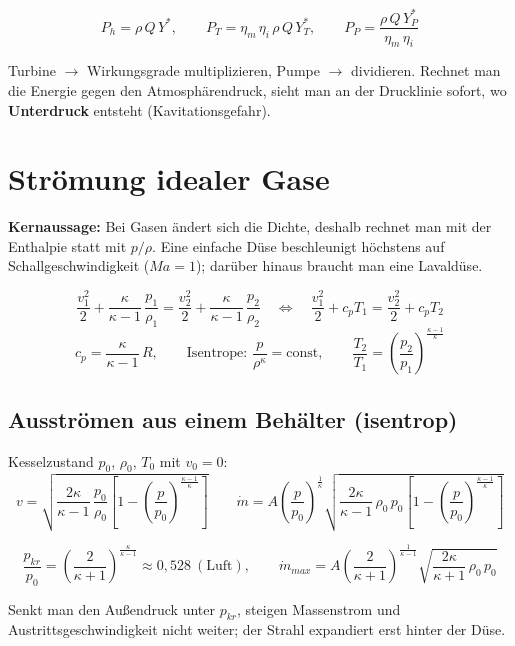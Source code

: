 \documentclass[11pt,a4paper]{article}
\begin{document}
\begin{formel}[title={Leistung}]
\[
P_h = \rho\,Q\,Y^*, \qquad
P_T = \eta_m\,\eta_i\,\rho\,Q\,Y_T^*, \qquad
P_P = \frac{\rho\,Q\,Y_P^*}{\eta_m\,\eta_i}
\]
\end{formel}

\begin{merke}
Turbine $\to$ Wirkungsgrade multiplizieren, Pumpe $\to$ dividieren. Rechnet man die Energie gegen den Atmosphärendruck, sieht man an der Drucklinie sofort, wo \textbf{Unterdruck} entsteht (Kavitationsgefahr).
\end{merke}

\section{Strömung idealer Gase}\label{sec:gas}

\textbf{Kernaussage:} Bei Gasen ändert sich die Dichte, deshalb rechnet man mit der Enthalpie statt mit $p/\rho$. Eine einfache Düse beschleunigt höchstens auf Schallgeschwindigkeit ($Ma = 1$); darüber hinaus braucht man eine Lavaldüse.

\begin{formel}[title={Energiesatz für Gase (Schwere vernachlässigt)}]
\[
\frac{v_1^2}{2} + \frac{\kappa}{\kappa - 1}\,\frac{p_1}{\rho_1} = \frac{v_2^2}{2} + \frac{\kappa}{\kappa - 1}\,\frac{p_2}{\rho_2}
\quad\Longleftrightarrow\quad
\frac{v_1^2}{2} + c_p T_1 = \frac{v_2^2}{2} + c_p T_2
\]
\[
c_p = \frac{\kappa}{\kappa - 1}\,R, \qquad
\text{Isentrope: } \frac{p}{\rho^\kappa} = \text{const}, \qquad
\frac{T_2}{T_1} = \left(\frac{p_2}{p_1}\right)^{\frac{\kappa-1}{\kappa}}
\]
\end{formel}

\subsection{Ausströmen aus einem Behälter (isentrop)}

Kesselzustand $p_0$, $\rho_0$, $T_0$ mit $v_0 = 0$:
\[
v = \sqrt{\frac{2\kappa}{\kappa - 1}\,\frac{p_0}{\rho_0}\left[1 - \left(\frac{p}{p_0}\right)^{\frac{\kappa - 1}{\kappa}}\right]}
\qquad
\dot m = A\left(\frac{p}{p_0}\right)^{\frac{1}{\kappa}}\sqrt{\frac{2\kappa}{\kappa - 1}\,\rho_0\,p_0\left[1 - \left(\frac{p}{p_0}\right)^{\frac{\kappa - 1}{\kappa}}\right]}
\]
\begin{formel}[title={Kritischer Zustand ($Ma^* = 1$, maximaler Massenstrom)}]
\[
\frac{p_{kr}}{p_0} = \left(\frac{2}{\kappa + 1}\right)^{\frac{\kappa}{\kappa - 1}} \approx 0{,}528 \ (\text{Luft}),
\qquad
\dot m_{max} = A\left(\frac{2}{\kappa + 1}\right)^{\frac{1}{\kappa - 1}}\sqrt{\frac{2\kappa}{\kappa + 1}\,\rho_0\,p_0}
\]
\end{formel}
Senkt man den Außendruck unter $p_{kr}$, steigen Massenstrom und Austrittsgeschwindigkeit nicht weiter; der Strahl expandiert erst hinter der Düse.
\end{document}

